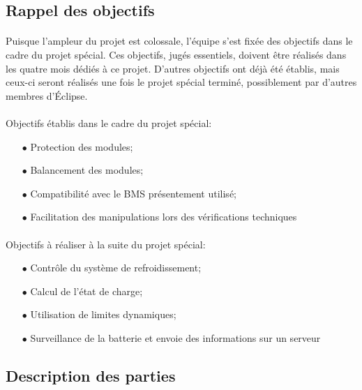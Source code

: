 	\subsection{Rappel des objectifs}
		\paragraph*{}		
		Puisque l'ampleur du projet est colossale, l'équipe s'est fixée des objectifs dans le cadre du projet spécial. Ces objectifs, jugés essentiels, doivent être réalisés dans les quatre mois dédiés à ce projet. D'autres objectifs ont déjà été établis, mais ceux-ci seront réalisés une fois le projet spécial terminé, possiblement par d'autres membres d'Éclipse.
		
		\paragraph*{}
		Objectifs établis dans le cadre du projet spécial:
		
			\begin{itemize}
				\item[$\bullet$] Protection des modules;
				\item[$\bullet$] Balancement des modules;
				\item[$\bullet$] Compatibilité avec le BMS présentement utilisé;
				\item[$\bullet$] Facilitation des manipulations lors des vérifications techniques
			\end{itemize}
		
		\paragraph*{}	
		Objectifs à réaliser à la suite du projet spécial:
		
			\begin{itemize}
				\item[$\bullet$] Contrôle du système de refroidissement;
				\item[$\bullet$] Calcul de l'état de charge;
				\item[$\bullet$] Utilisation de limites dynamiques;
				\item[$\bullet$] Surveillance de la batterie et envoie des informations sur un serveur
			\end{itemize}		
	
	\subsection{Description des parties}
